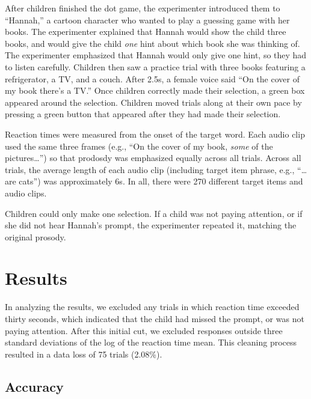 \documentclass[10pt, letterpaper]{article}
\begin{document}
After children finished the dot game, the experimenter introduced them
to ``Hannah,'' a cartoon character who wanted to play a guessing game
with her books. The experimenter explained that Hannah would show the
child three books, and would give the child \emph{one} hint about which
book she was thinking of. The experimenter emphasized that Hannah would
only give one hint, so they had to listen carefully. Children then saw a
practice trial with three books featuring a refrigerator, a TV, and a
couch. After 2.5s, a female voice said ``On the cover of my book there's
a TV.'' Once children correctly made their selection, a green box
appeared around the selection. Children moved trials along at their own
pace by pressing a green button that appeared after they had made their
selection.

Reaction times were measured from the onset of the target word. Each
audio clip used the same three frames (e.g., ``On the cover of my book,
\emph{some} of the pictures\ldots{}'') so that prodosdy was emphasized
equally across all trials. Across all trials, the average length of each
audio clip (including target item phrase, e.g., ``\ldots{}are cats'')
was approximately 6s. In all, there were 270 different target items and
audio clips.

Children could only make one selection. If a child was not paying
attention, or if she did not hear Hannah's prompt, the experimenter
repeated it, matching the original prosody.

\section{Results}\label{results}

In analyzing the results, we excluded any trials in which reaction time
exceeded thirty seconds, which indicated that the child had missed the
prompt, or was not paying attention. After this initial cut, we excluded
responses outside three standard deviations of the log of the reaction
time mean. This cleaning process resulted in a data loss of 75 trials
(2.08\%).

\subsection{Accuracy}\label{accuracy}
\end{document}
